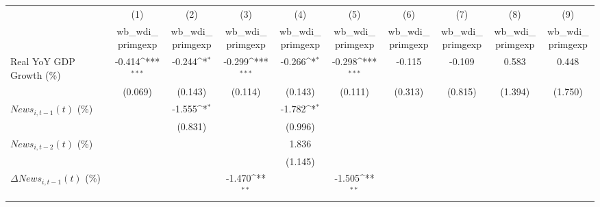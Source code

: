 {
\def\sym#1{\ifmmode^{#1}\else\(^{#1}\)\fi}
\begin{tabular}{l*{9}{c}}
\toprule
                    &\multicolumn{1}{c}{(1)}&\multicolumn{1}{c}{(2)}&\multicolumn{1}{c}{(3)}&\multicolumn{1}{c}{(4)}&\multicolumn{1}{c}{(5)}&\multicolumn{1}{c}{(6)}&\multicolumn{1}{c}{(7)}&\multicolumn{1}{c}{(8)}&\multicolumn{1}{c}{(9)}\\
                    &\multicolumn{1}{c}{wb_wdi_primgexp}&\multicolumn{1}{c}{wb_wdi_primgexp}&\multicolumn{1}{c}{wb_wdi_primgexp}&\multicolumn{1}{c}{wb_wdi_primgexp}&\multicolumn{1}{c}{wb_wdi_primgexp}&\multicolumn{1}{c}{wb_wdi_primgexp}&\multicolumn{1}{c}{wb_wdi_primgexp}&\multicolumn{1}{c}{wb_wdi_primgexp}&\multicolumn{1}{c}{wb_wdi_primgexp}\\
\midrule
Real YoY GDP Growth (\%)&      -0.414\sym{***}&      -0.244\sym{*}  &      -0.299\sym{***}&      -0.266\sym{*}  &      -0.298\sym{***}&      -0.115         &      -0.109         &       0.583         &       0.448         \\
                    &     (0.069)         &     (0.143)         &     (0.114)         &     (0.143)         &     (0.111)         &     (0.313)         &     (0.815)         &     (1.394)         &     (1.750)         \\
\addlinespace
$ News_{i,t-1}(t)$ (\%)&                     &      -1.555\sym{*}  &                     &      -1.782\sym{*}  &                     &                     &                     &                     &                     \\
                    &                     &     (0.831)         &                     &     (0.996)         &                     &                     &                     &                     &                     \\
\addlinespace
$ News_{i,t-2}(t)$ (\%)&                     &                     &                     &       1.836         &                     &                     &                     &                     &                     \\
                    &                     &                     &                     &     (1.145)         &                     &                     &                     &                     &                     \\
\addlinespace
$ \Delta News_{i,t-1}(t)$ (\%)&                     &                     &      -1.470\sym{**} &                     &      -1.505\sym{**} &                     &                     &                     &                     \\

\end{tabular}}
